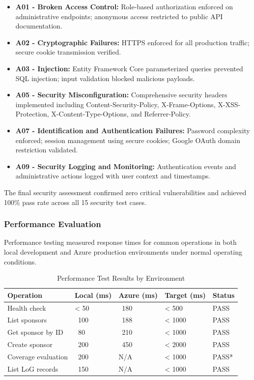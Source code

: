 \begin{itemize}
    \item \textbf{A01 - Broken Access Control:} Role-based authorization enforced on administrative endpoints; anonymous access restricted to public API documentation.
    \item \textbf{A02 - Cryptographic Failures:} HTTPS enforced for all production traffic; secure cookie transmission verified.
    \item \textbf{A03 - Injection:} Entity Framework Core parameterized queries prevented SQL injection; input validation blocked malicious payloads.
    \item \textbf{A05 - Security Misconfiguration:} Comprehensive security headers implemented including Content-Security-Policy, X-Frame-Options, X-XSS-Protection, X-Content-Type-Options, and Referrer-Policy.
    \item \textbf{A07 - Identification and Authentication Failures:} Password complexity enforced; session management using secure cookies; Google OAuth domain restriction validated.
    \item \textbf{A09 - Security Logging and Monitoring:} Authentication events and administrative actions logged with user context and timestamps.
\end{itemize}

The final security assessment confirmed zero critical vulnerabilities and achieved 100\% pass rate across all 15 security test cases.

\subsubsection{Performance Evaluation}

Performance testing measured response times for common operations in both local development and Azure production environments under normal operating conditions.

\begin{table}[h!]
\centering
\caption{Performance Test Results by Environment}
\label{tab:performance_results}
\renewcommand{\arraystretch}{1.15}
\setlength{\tabcolsep}{4pt}
\begin{tabularx}{\textwidth}{@{}
  >{\RaggedRight\arraybackslash}p{4.0cm}
  >{\RaggedLeft\arraybackslash}p{2.0cm}
  >{\RaggedLeft\arraybackslash}p{2.0cm}
  >{\RaggedLeft\arraybackslash}p{2.0cm}
  >{\RaggedLeft\arraybackslash}p{1.8cm}
@{}}
\toprule
\textbf{Operation} & \textbf{Local (ms)} & \textbf{Azure (ms)} & \textbf{Target (ms)} & \textbf{Status} \\
\midrule
Health check & < 50 & ~180 & < 500 & PASS \\
List sponsors & ~100 & ~188 & < 1000 & PASS \\
Get sponsor by ID & ~80 & ~210 & < 1000 & PASS \\
Create sponsor & ~200 & ~450 & < 2000 & PASS \\
Coverage evaluation & ~200 & N/A & < 1000 & PASS* \\
List LoG records & ~150 & N/A & < 1000 & PASS \\
\bottomrule
\end{tabularx}
\end{table}

